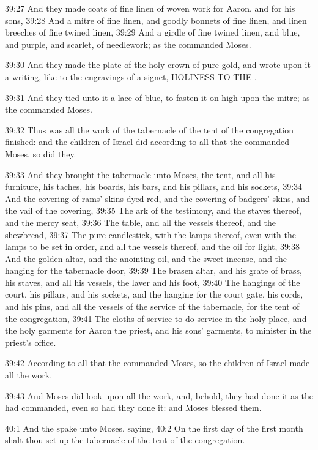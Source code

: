 39:27 And they made coats of fine linen of woven work for Aaron, and for his sons, 39:28 And a mitre of fine linen, and goodly bonnets of fine linen, and linen breeches of fine twined linen, 39:29 And a girdle of fine twined linen, and blue, and purple, and scarlet, of needlework; as the \LORD commanded Moses.

39:30 And they made the plate of the holy crown of pure gold, and wrote upon it a writing, like to the engravings of a signet, HOLINESS TO THE \LORD.

39:31 And they tied unto it a lace of blue, to fasten it on high upon the mitre; as the \LORD commanded Moses.

39:32 Thus was all the work of the tabernacle of the tent of the congregation finished: and the children of Israel did according to all that the \LORD commanded Moses, so did they.

39:33 And they brought the tabernacle unto Moses, the tent, and all his furniture, his taches, his boards, his bars, and his pillars, and his sockets, 39:34 And the covering of rams' skins dyed red, and the covering of badgers' skins, and the vail of the covering, 39:35 The ark of the testimony, and the staves thereof, and the mercy seat, 39:36 The table, and all the vessels thereof, and the shewbread, 39:37 The pure candlestick, with the lamps thereof, even with the lamps to be set in order, and all the vessels thereof, and the oil for light, 39:38 And the golden altar, and the anointing oil, and the sweet incense, and the hanging for the tabernacle door, 39:39 The brasen altar, and his grate of brass, his staves, and all his vessels, the laver and his foot, 39:40 The hangings of the court, his pillars, and his sockets, and the hanging for the court gate, his cords, and his pins, and all the vessels of the service of the tabernacle, for the tent of the congregation, 39:41 The cloths of service to do service in the holy place, and the holy garments for Aaron the priest, and his sons' garments, to minister in the priest's office.

39:42 According to all that the \LORD commanded Moses, so the children of Israel made all the work.

39:43 And Moses did look upon all the work, and, behold, they had done it as the \LORD had commanded, even so had they done it: and Moses blessed them.

40:1 And the \LORD spake unto Moses, saying, 40:2 On the first day of the first month shalt thou set up the tabernacle of the tent of the congregation.


